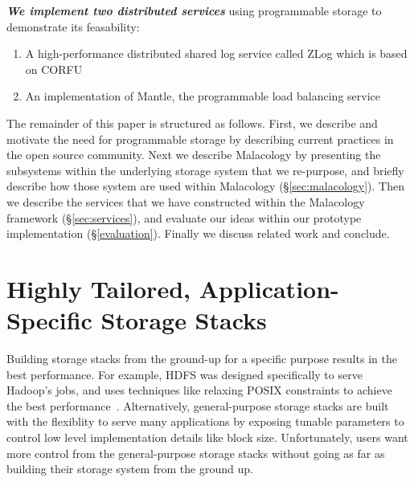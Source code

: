 \documentclass[preprint]{sigplanconf-eurosys}
\begin{document}
{\it \textbf{We implement two distributed services}} using programmable storage
to demonstrate its feasability:

\begin{enumerate}

\item A high-performance distributed shared log service called ZLog which is
based on CORFU~\cite{balakrishnan_corfu_2012}

\item An implementation of Mantle, the programmable load balancing
service~\cite{sevilla:sc15-mantle}

\end{enumerate}

The remainder of this paper is structured as follows. First, we describe and
motivate the need for programmable storage by describing current practices in
the open source community. Next we describe Malacology by presenting the
subsystems within the underlying storage system that we re-purpose, and briefly
describe how those system are used within Malacology (\S\ref{sec:malacology}).
Then we describe the services that we have constructed within the Malacology
framework (\S\ref{sec:services}), and evaluate our ideas within our prototype
implementation (\S\ref{evaluation}).  Finally we discuss related work and
conclude.

\section{Highly Tailored, Application-Specific Storage Stacks
}\label{highly-tailored-and-application-specifc-storage-systems}

Building storage stacks from the ground-up for a specific purpose results in
the best performance. For example, HDFS was designed specifically to serve
Hadoop's jobs, and uses techniques like relaxing POSIX constraints to achieve
the best performance~\cite{CITEME}. Alternatively, general-purpose storage
stacks are built with the flexiblity to serve many applications by exposing
tunable parameters to control low level implementation details like block size.
Unfortunately, users want more control from the general-purpose storage stacks
without going as far as building their storage system from the ground up.

\end{document}
